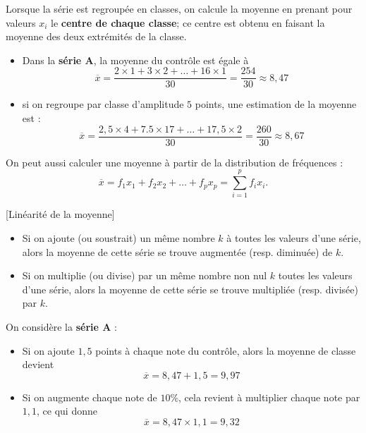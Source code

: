\begin{rem}{}{}
   Lorsque la série est regroupée en classes, on calcule la moyenne en prenant pour valeurs $x_i$ le \textbf{centre de chaque classe}; ce centre est obtenu en faisant la moyenne des deux extrémités de la classe.
\end{rem}
\medskip

\begin{ex}{}{}
   \begin{itemize}
     \item  Dans la \textbf{série A}, la moyenne du contrôle est égale à $$\overline{x} =\dfrac{2\times1+3\times2+\dots+16\times1}{30} =\dfrac{254}{30} \approx 8,47$$
     \item  si on regroupe par classe d'amplitude $5$ points, une estimation de la moyenne est : $$\overline{x} = \dfrac{2,5\times4+7.5\times17+\dots+17,5\times2}{30} =\dfrac{260}{30}\approx 8,67$$
   \end{itemize}
\end{ex}
\medskip

\begin{rem}{}{}
   On peut aussi calculer une moyenne à partir de la distribution de fréquences : $$\overline{x} =f_1x_1+f_2x_2+\dots +f_px_p =\sum_{i=1}^p f_ix_i.$$
\end{rem}
\medskip

\begin{prop}{}{}[Linéarité de la moyenne]

   \begin{itemize}
      \item  Si on ajoute (ou soustrait) un même nombre $k$ à toutes les valeurs d'une série, alors la moyenne de cette série se trouve augmentée (resp. diminuée) de $k$.
      \item  Si on multiplie (ou divise) par un même nombre non nul $k$ toutes les valeurs d'une série, alors la moyenne de cette série se trouve multipliée (resp. divisée) par $k$.
   \end{itemize}
\end{prop}

\begin{ex}{}{}
   On considère la \textbf{série A} :
   \begin{itemize}
      \item  Si on ajoute $1,5$ points à chaque note du contrôle, alors la moyenne de classe devient $$\overline{x}=8,47+1,5=9,97$$
      \item  Si on augmente chaque note de $10\%$, cela revient à multiplier chaque note par $1,1$, ce qui donne $$\overline{x}=8,47\times1,1=9,32$$
   \end{itemize}
\end{ex}


